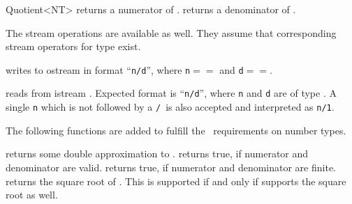 \begin{ccRefClass} {Quotient<NT>}
       {returns a numerator of .}
\ccGlue
{}
       {returns a denominator of .}

\ccHidden {}
{}

The stream operations are available as well. 
They assume that corresponding stream operators for type  exist.

       {writes  to ostream  in format ``{\tt n/d}'', where
       {\tt n}$==$ and {\tt d}$==$.}

       {reads  from istream . Expected format is
        ``{\tt n/d}'', where {\tt n} and {\tt d} are of type .
        A single {\tt n} which is not followed by a {\tt /}\  is also
        accepted and interpreted as {\tt n/1}.}

The following functions are added to fulfill the \cgal\ requirements
on number types.

       {returns some double approximation to .}
\ccGlue
{}
       {returns true, if numerator and denominator are valid.}
\ccGlue
{}
       {returns true, if numerator and denominator are finite.}
\ccGlue
{}
       {returns the square root of .  This is supported if and only if
         supports the square root as well.}

\end{ccRefClass} 
